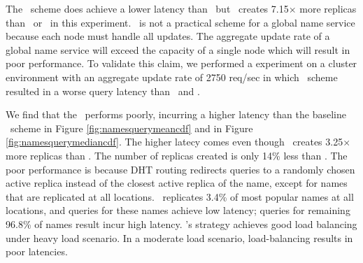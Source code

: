 



The \replicateall\ scheme does achieve a lower latency than \locaware\ but \replicateall\ creates 7.15$\times$ more replicas than \locaware\ or \uniform\ in this experiment. \replicateall\ is not a practical scheme for a global name service because each node must handle all updates. The aggregate update rate of a global name service  will exceed the capacity of a single node which will result in poor performance. To validate this claim, we performed a experiment on a cluster environment with an aggregate update rate of 2750 req/sec in which \replicateall\ scheme resulted in a worse query latency than  \staticthree\ and \locaware.

We find that the \codons\ performs poorly, incurring a higher latency than the baseline \staticthree\ scheme in Figure \ref{fig:namesquerymeancdf} and in Figure \ref{fig:namesquerymediancdf}. 
The higher latecy comes even though \codons\ creates 3.25$\times$ more replicas than \staticthree. 
The number of replicas created is only 14\% less than \uniform.
The poor performance is because DHT routing redirects queries to a randomly chosen active replica instead of the closest active replica of the name, except for names that are replicated at all locations.
\codons\ replicates 3.4\% of most popular names at all locations, and queries for these names achieve low latency; queries for remaining 96.8\% of names result incur high latency.
\codons's strategy achieves good load balancing under heavy load scenario. In a moderate load scenario, load-balancing results in poor latencies.







%
%
%




